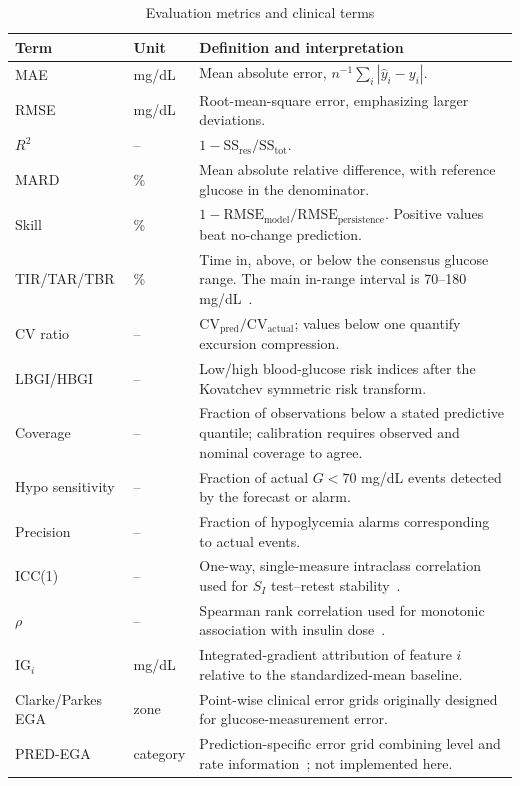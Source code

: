 \documentclass[journal]{IEEEtran}
\begin{document}
\begin{table}[t]
\centering
\caption{Evaluation metrics and clinical terms}
\label{tab:metrics}
\footnotesize
\begin{tabular}{llp{12.3cm}}
\toprule
Term & Unit & Definition and interpretation \\
\midrule
MAE & mg/dL & Mean absolute error, $n^{-1}\sum_i |\hat{y}_i - y_i|$. \\
RMSE & mg/dL & Root-mean-square error, emphasizing larger deviations. \\
$R^2$ & -- & $1 - \text{SS}_{\text{res}}/\text{SS}_{\text{tot}}$. \\
MARD & \% & Mean absolute relative difference, with reference glucose in the denominator. \\
Skill & \% & $1 - \text{RMSE}_{\text{model}}/\text{RMSE}_{\text{persistence}}$. Positive values beat no-change prediction. \\
TIR/TAR/TBR & \% & Time in, above, or below the consensus glucose range. The main in-range interval is 70--180 mg/dL~\cite{ref52}. \\
CV ratio & -- & $\text{CV}_{\text{pred}}/\text{CV}_{\text{actual}}$; values below one quantify excursion compression. \\
LBGI/HBGI & -- & Low/high blood-glucose risk indices after the Kovatchev symmetric risk transform. \\
Coverage & -- & Fraction of observations below a stated predictive quantile; calibration requires observed and nominal coverage to agree. \\
Hypo sensitivity & -- & Fraction of actual $G<70$ mg/dL events detected by the forecast or alarm. \\
Precision & -- & Fraction of hypoglycemia alarms corresponding to actual events. \\
ICC(1) & -- & One-way, single-measure intraclass correlation used for $S_I$ test--retest stability~\cite{ref50}. \\
$\rho$ & -- & Spearman rank correlation used for monotonic association with insulin dose~\cite{ref51}. \\
$\text{IG}_i$ & mg/dL & Integrated-gradient attribution of feature $i$ relative to the standardized-mean baseline. \\
Clarke/Parkes EGA & zone & Point-wise clinical error grids originally designed for glucose-measurement error. \\
PRED-EGA & category & Prediction-specific error grid combining level and rate information~\cite{ref53}; not implemented here. \\
\bottomrule
\end{tabular}
\end{table}
\end{document}
